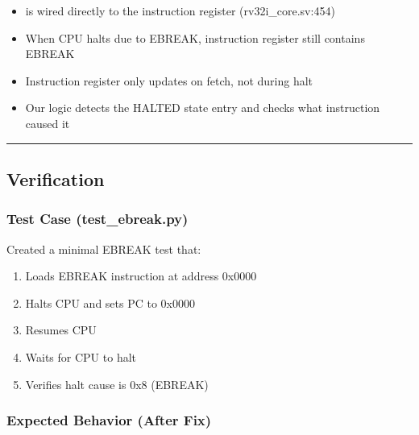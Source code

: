 \begin{record}

\begin{itemize}
\tightlist
\item
   is wired directly to the instruction register
  (rv32i\_\allowbreak{}core.sv:454)
\item
  When CPU halts due to EBREAK, instruction register still contains
  EBREAK
\item
  Instruction register only updates on fetch, not during halt
\item
  Our logic detects the HALTED state entry and checks what instruction
  caused it
\end{itemize}

\begin{center}\rule{0.5\linewidth}{0.5pt}\end{center}

\end{record}

\subsection{Verification}\label{cr:fix:ebreak-bug-fix:verification}

\subsubsection{\texorpdfstring{Test Case
(test\_\allowbreak{}ebreak.py)}{Test Case (test\_ebreak.py)}}\label{cr:fix:ebreak-bug-fix:test-case-test-ebreakpy}

\begin{record}

Created a minimal EBREAK test that:

\begin{enumerate}
\def\labelenumi{\arabic{enumi}.}
\tightlist
\item
  Loads EBREAK instruction at address 0x0000
\item
  Halts CPU and sets PC to 0x0000
\item
  Resumes CPU
\item
  Waits for CPU to halt
\item
  Verifies halt cause is 0x8 (EBREAK)
\end{enumerate}

\end{record}

\subsubsection{Expected Behavior (After Fix)}\label{cr:fix:ebreak-bug-fix:expected-behavior-after-fix}

